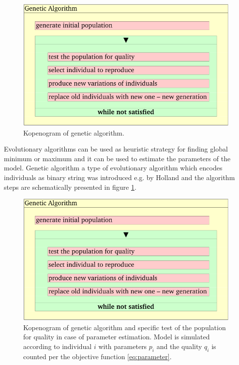 \begin{figure}[htb]
    \centering
    \includegraphics[page=1]{chapter3/GA-kopenogram-crop.pdf}    
    \caption{Kopenogram of genetic algorithm. 
    }
    \label{fig:GA-kopenogram}
\end{figure}

Evolutionary algorithms can be used as heuristic strategy for finding global minimum or maximum and it can be used to estimate the parameters of the model. Genetic algorithm a type of evolutionary algorithm which encodes individuals as binary string was introduced e.g. by Holland\cite{Holland1975} and the algorithm steps are schematically presented in figure \ref{fig:GA-kopenogram}.

\begin{figure}[htb]
    \centering
    \includegraphics[page=2]{chapter3/GA-kopenogram-crop.pdf}    
    \caption{Kopenogram of genetic algorithm and specific test of the population for quality in case of parameter estimation. Model is simulated according to individual $i$ with parameters $p_i$ and the quality $q_i$ is counted per the objective function \ref{eq:parameter}.
    }
    \label{fig:GA-kopenogram2}
\end{figure}

